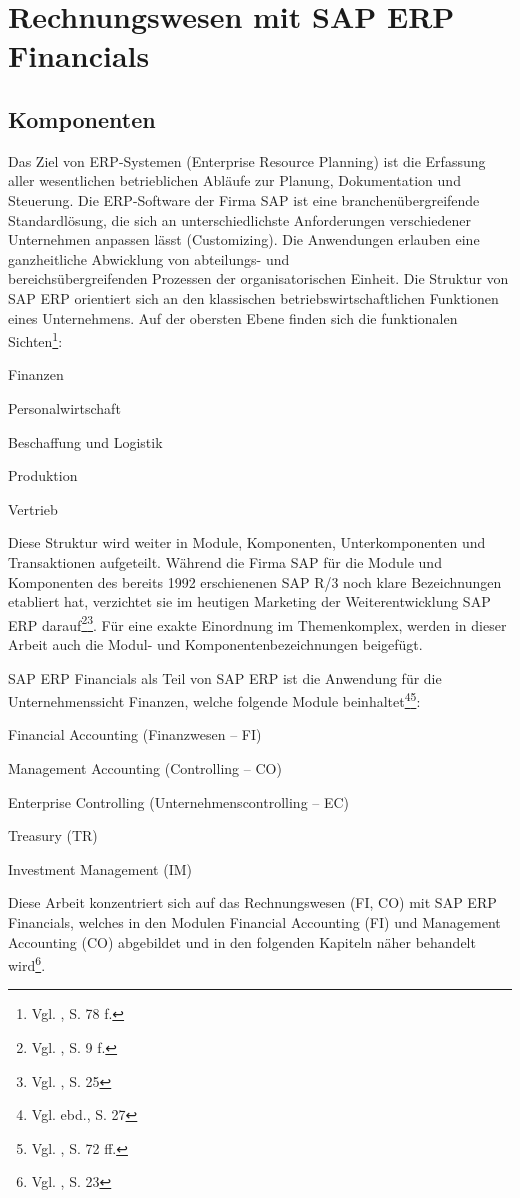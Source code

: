 \section{Rechnungswesen mit SAP ERP Financials}
\subsection{Komponenten}
\label{sec:Komponenten}
Das Ziel von ERP-Systemen (Enterprise Resource Planning) ist die Erfassung aller wesentlichen betrieblichen Abläufe zur Planung, Dokumentation und Steuerung. Die ERP-Software der Firma SAP ist eine branchenübergreifende Standardlösung, die sich an unterschiedlichste Anforderungen verschiedener Unternehmen anpassen lässt (Customizing). Die Anwendungen erlauben eine ganzheitliche Abwicklung von abteilungs- und\\bereichsübergreifenden Prozessen der organisatorischen Einheit. Die Struktur von SAP ERP orientiert sich an den klassischen betriebswirtschaftlichen Funktionen eines Unternehmens. Auf der obersten Ebene finden sich die funktionalen Sichten\footnote{Vgl. \cite{Bauer2009}, S. 78 f.}:
\begin{compactitem}
\item Finanzen
\item Personalwirtschaft
\item Beschaffung und Logistik
\item Produktion
\item Vertrieb
\end{compactitem}
Diese Struktur wird weiter in Module, Komponenten, Unterkomponenten und Transaktionen aufgeteilt. Während die Firma SAP für die Module und Komponenten des bereits 1992 erschienenen SAP R/3 noch klare Bezeichnungen etabliert hat, verzichtet sie im heutigen Marketing der Weiterentwicklung SAP ERP darauf\footnote{Vgl. \cite{Klein2010}, S. 9 f.}\footnote{Vgl. \cite{Hefner2001}, S. 25}. Für eine exakte Einordnung im Themenkomplex, werden in dieser Arbeit auch die Modul- und Komponentenbezeichnungen beigefügt.

SAP ERP Financials als Teil von SAP ERP ist die Anwendung für die Unternehmenssicht Finanzen, welche folgende Module beinhaltet\footnote{Vgl. ebd., S. 27}\footnote{Vgl. \cite{Muir2009}, S. 72 ff.}:
\begin{compactitem}
\item Financial Accounting (Finanzwesen -- FI)
\item Management Accounting (Controlling -- CO)
\item Enterprise Controlling (Unternehmenscontrolling -- EC)
\item Treasury (TR)
\item Investment Management (IM)
\end{compactitem}
Diese Arbeit konzentriert sich auf das Rechnungswesen (FI, CO) mit SAP ERP Financials, welches in den Modulen Financial Accounting (FI) und Management Accounting (CO) abgebildet und in den folgenden Kapiteln näher behandelt wird\footnote{Vgl. \cite{Patel2009}, S. 23}.

